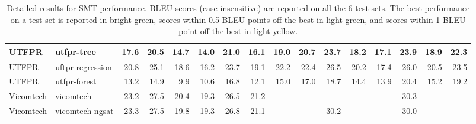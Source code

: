 \begin{table*}
\begin{center}
\begin{tabular}{|l|l|rrrrrrr|rrrrrrr|}
UTFPR & utfpr-tree & 17.6 & 20.5 & 14.7 & 14.0 & 21.0 & 16.1 & 19.0 & 20.7 & 23.7 & 18.2 & 17.1 & 23.9 & 18.9 & 22.3 \\ \hline
UTFPR & uftpr-regression & 20.8 & 25.1 & 18.6 & 16.2 & 23.7 & 19.1 & 22.2 & 22.4 & 26.5 & 20.2 & 17.4 & 26.0 & 20.5 & 23.5 \\ \hline
UTFPR & utfpr-forest & 13.2 & 14.9 & 9.9 & 10.6 & 16.8 & 12.1 & 15.0 & 17.0 & 18.7 & 14.4 & 13.9 & 20.4 & 15.2 & 19.2 \\ \hline
Vicomtech & vicomtech & 23.2 & 27.5 & 20.4 & 19.3 & 26.5 & 21.2 & \cellcolor{lightyellow}{24.6} & \cellcolor{lightyellow}{25.9} & \cellcolor{lightyellow}{30.5} & \cellcolor{lightyellow}{22.5} & \cellcolor{lightgreen}{22.2} & 30.3 & \cellcolor{lightyellow}{23.4} & \cellcolor{lightgreen}{26.6} \\ \hline
Vicomtech & vicomtech-ngsat & 23.3 & 27.5 & 19.8 & 19.3 & 26.8 & 21.1 & \cellcolor{lightgreen}{25.1} & \cellcolor{lightyellow}{25.8} & 30.2 & \cellcolor{lightyellow}{22.4} & \cellcolor{lightgreen}{22.1} & 30.0 & \cellcolor{lightyellow}{23.4} & \cellcolor{lightgreen}{26.7} \\ \hline
\end{tabular}
\end{center}
\caption{Detailed results for SMT performance. BLEU scores (case-insensitive) are reported on all the 6 test sets. The best performance on a test set is reported in bright green, scores within 0.5 BLEU points off the best in light green, and scores within 1 BLEU point off the best in light yellow.}
\label{tab:results-by-test-set-smt}
\end{table*}


